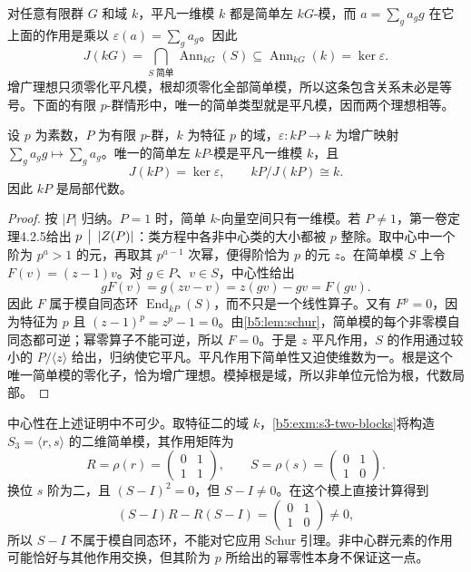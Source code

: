 \ProseParagraphBreak
对任意有限群 \(G\) 和域 \(k\)，平凡一维模 \(k\) 都是简单左 \(kG\)-模，而 \(a=\sum_g a_gg\) 在它上面的作用是乘以 \(\varepsilon(a)=\sum_g a_g\)。因此
\[
	J(kG)=\bigcap_{S\;\text{简单}}\operatorname{Ann}_{kG}(S) \subseteq\operatorname{Ann}_{kG}(k)=\ker\varepsilon.
\]
增广理想只须零化平凡模，根却须零化全部简单模，所以这条包含关系未必是等号。下面的有限 \(p\)-群情形中，唯一的简单类型就是平凡模，因而两个理想相等。
\begin{proposition}\label{b5:prop:p-group-local}
	设 \(p\) 为素数，\(P\) 为有限 \(p\)-群，\(k\) 为特征 \(p\) 的域，\(\varepsilon:kP\to k\) 为增广映射 \(\sum_g a_gg\mapsto\sum_g a_g\)。唯一的简单左 \(kP\)-模是平凡一维模 \(k\)，且
	\[
		J(kP)=\ker\varepsilon,\qquad kP/J(kP)\cong k.
	\]
	因此 \(kP\) 是局部代数。
\end{proposition}
\begin{proof}
	按 \(|P|\) 归纳。\(P=1\) 时，简单 \(k\)-向量空间只有一维模。若 \(P\ne1\)，第一卷定理4.2.5给出 \(p\,\bigm\vert\,|Z(P)|\)：类方程中各非中心类的大小都被 \(p\) 整除。取中心中一个阶为 \(p^a>1\) 的元，再取其 \(p^{a-1}\) 次幂，便得阶恰为 \(p\) 的元 \(z\)。在简单模 \(S\) 上令 \(F(v)=(z-1)v\)。对 \(g\in P\)、\(v\in S\)，中心性给出
	\[
		gF(v)=g(zv-v)=z(gv)-gv=F(gv).
	\]
	因此 \(F\) 属于模自同态环 \(\operatorname{End}_{kP}(S)\)，而不只是一个线性算子。又有 \(F^p=0\)，因为特征为 \(p\) 且 \((z-1)^p=z^p-1=0\)。由\cref{b5:lem:schur}，简单模的每个非零模自同态都可逆；幂零算子不能可逆，所以 \(F=0\)。于是 \(z\) 平凡作用，\(S\) 的作用通过较小的 \(P/\langle z\rangle\) 给出，归纳使它平凡。平凡作用下简单性又迫使维数为一。根是这个唯一简单模的零化子，恰为增广理想。模掉根是域，所以非单位元恰为根，代数局部。
\end{proof}
中心性在上述证明中不可少。取特征二的域 \(k\)，\cref{b5:exm:s3-two-blocks}将构造 \(S_3=\langle r,s\rangle\) 的二维简单模，其作用矩阵为
\[
	R=\rho(r)=\begin{pmatrix}0&1\\1&1\end{pmatrix},\qquad
	S=\rho(s)=\begin{pmatrix}0&1\\1&0\end{pmatrix}.
\]
换位 \(s\) 阶为二，且 \((S-I)^2=0\)，但 \(S-I\ne0\)。在这个模上直接计算得到
\[
	(S-I)R-R(S-I)=\begin{pmatrix}0&1\\1&0\end{pmatrix}\ne0,
\]
所以 \(S-I\) 不属于模自同态环，不能对它应用 Schur 引理。非中心群元素的作用可能恰好与其他作用交换，但其阶为 \(p\) 所给出的幂零性本身不保证这一点。

